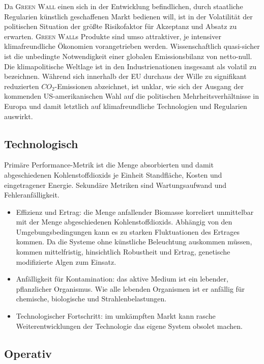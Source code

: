 Da \textsc{Green Wall} einen sich in der Entwicklung befindlichen, durch staatliche Regularien künstlich geschaffenen Markt bedienen will, ist in der Volatilität der politischen Situation der größte Risikofaktor für Akzeptanz und Absatz zu erwarten.
\textsc{Green Wall}s Produkte sind umso attraktiver, je intensiver klimafreundliche Ökonomien vorangetrieben werden.
Wissenschaftlich quasi-sicher ist die unbedingte Notwendigkeit einer globalen Emissionsbilanz von netto-null.
Die klimapolitische Weltlage ist in den Industrienationen insgesamt als volatil zu bezeichnen.
Während sich innerhalb der EU durchaus der Wille zu signifikant reduzierten \(CO_2\)-Emissionen abzeichnet, ist unklar, wie sich der Ausgang der kommenden US-amerikanischen Wahl auf die politischen Mehrheitsverhältnisse in Europa und damit letztlich auf klimafreundliche Technologien und Regularien auswirkt.

\subsection{Technologisch}

Primäre Performance-Metrik ist die Menge absorbierten und damit abgeschiedenen Kohlenstoffdioxids je Einheit Standfläche, Kosten und eingetragener Energie.
Sekundäre Metriken sind Wartungsaufwand und Fehleranfälligkeit.
\begin{itemize}
    \item Effizienz und Ertrag: die Menge anfallender Biomasse korreliert unmittelbar mit der Menge abgeschiedenen Kohlenstoffdioxids.
          Abhängig von den Umgebungsbedingungen kann es zu starken Fluktuationen des Ertrages kommen.
          Da die Systeme ohne künstliche Beleuchtung auskommen müssen, kommen mittelfristig, hinsichtlich Robustheit und Ertrag, genetische modifizierte Algen zum Einsatz.
    \item Anfälligkeit für Kontamination: das aktive Medium ist ein lebender, pflanzlicher Organismus. Wie alle lebenden Organismen ist er anfällig für chemische, biologische und Strahlenbelastungen.
    \item Technologischer Fortschritt: im umkämpften Markt kann rasche Weiterentwicklungen der Technologie das eigene System obsolet machen.
\end{itemize}

\subsection{Operativ}

